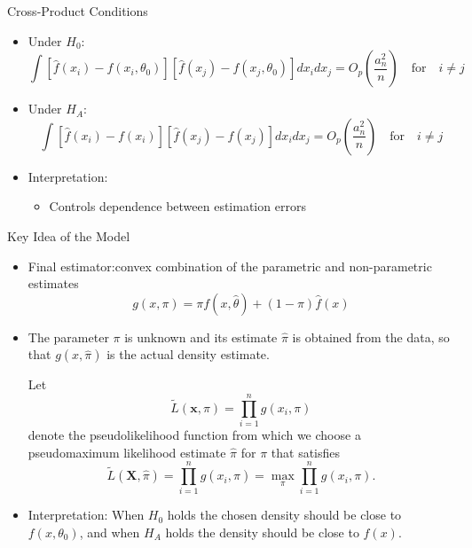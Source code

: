 \begin{frame}{Cross-Product Conditions}
\begin{itemize}
    \item Under $H_0$:
    \[
    \int [\hat{f}(x_i)-f(x_i, \theta_0)][\hat{f}(x_j)-f(x_j,\theta_0)] dx_i dx_j
    = O_p\left(\frac{a_n^2}{n}\right)\quad \text{for}\quad i\neq j
    \]

    \item Under $H_A$:
    \[
    \int [\hat{f}(x_i)-f(x_i)][\hat{f}(x_j)-f(x_j)] dx_i dx_j
    = O_p\left(\frac{a_n^2}{n}\right)\quad \text{for}\quad i \neq j 
    \]

    \item Interpretation:
    \begin{itemize}
        \item Controls dependence between estimation errors
    \end{itemize}
\end{itemize}
\end{frame}


\begin{frame}{Key Idea of the Model}
\begin{itemize}
    \item Final estimator:convex combination of the parametric and non-parametric estimates
    \[
    g(x,\pi) = \pi f(x,\hat{\theta}) + (1-\pi)\hat{f}(x)
    \]

    \item The parameter $\pi$ is unknown and its estimate $\hat{\pi}$ is obtained from the data, so that $g(x,\hat\pi)$ is the actual density estimate. 

Let
\[
\tilde L(\mathbf{x},\pi) = \prod_{i=1}^n g(x_i,\pi)
\]
denote the pseudolikelihood function from which we choose a pseudomaximum likelihood estimate $\hat{\pi}$ for $\pi$ that satisfies
\[
\tilde L(\mathbf{X},\hat{\pi}) = \prod_{i=1}^n g(x_i,\hat{\pi})
= \max_{\pi} \prod_{i=1}^n g(x_i,\pi).
\]

    \item Interpretation:
    When $H_0$ holds the chosen density should be close to $f(x,\theta_0)$, and when $H_A$ holds the density should be close to $f(x)$.
\end{itemize}
\end{frame}

